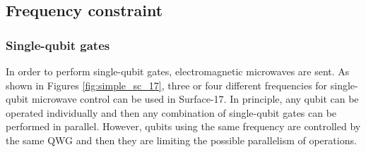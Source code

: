











\subsection{Frequency constraint}
\label{sec:orgff4c391}

\subsubsection{Single-qubit gates}

In order to perform single-qubit gates, electromagnetic microwaves are sent. As shown in Figures \ref{fig:simple_sc_17}, three or four different frequencies for single-qubit microwave control can be used in Surface-17. In principle, any qubit can be operated individually and then any combination of single-qubit gates can be performed in parallel. However, qubits using the same frequency are controlled by the same QWG and then they are limiting the possible parallelism of operations.


